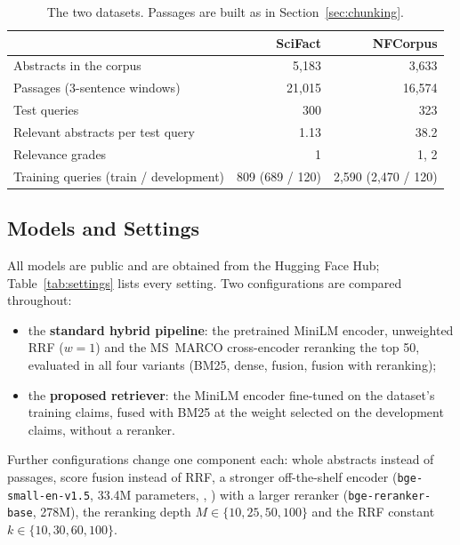 \begin{table}[t]
\centering\small
\caption{The two datasets. Passages are built as in Section~\ref{sec:chunking}.}
\label{tab:datasets}
\begin{tabular}{@{}lrr@{}}
\toprule
& SciFact & NFCorpus \\
\midrule
Abstracts in the corpus & 5,183 & 3,633 \\
Passages (3-sentence windows) & 21,015 & 16,574 \\
Test queries & 300 & 323 \\
Relevant abstracts per test query & 1.13 & 38.2 \\
Relevance grades & 1 & 1, 2 \\
Training queries (train / development) & 809 (689 / 120) & 2,590 (2,470 / 120) \\
\bottomrule
\end{tabular}
\end{table}

\subsection{Models and Settings}
\label{sec:models}

All models are public and are obtained from the Hugging Face Hub; Table~\ref{tab:settings} lists
every setting. Two configurations are compared throughout:

\begin{itemize}
\item the \textbf{standard hybrid pipeline}: the pretrained MiniLM encoder, unweighted RRF
($w = 1$) and the MS~MARCO cross-encoder reranking the top 50, evaluated in all four variants
(BM25, dense, fusion, fusion with reranking);
\item the \textbf{proposed retriever}: the MiniLM encoder fine-tuned on the dataset's training
claims, fused with BM25 at the weight selected on the development claims, without a reranker.
\end{itemize}

\noindent Further configurations change one component each: whole abstracts instead of
passages, score fusion instead of RRF, a stronger off-the-shelf encoder
(\texttt{bge-small-en-v1.5}, 33.4M parameters, \citeauthor{xiao2024cpack},
\citeyear{xiao2024cpack}) with a larger reranker (\texttt{bge-reranker-base}, 278M), the
reranking depth $M \in \{10, 25, 50, 100\}$ and the RRF constant $k \in \{10, 30, 60, 100\}$.

